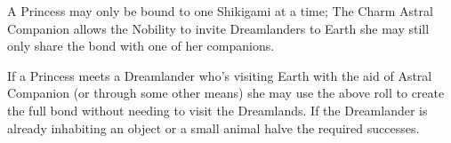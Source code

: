 A Princess may only be bound to one Shikigami at a time; The Charm Astral Companion allows the Nobility to invite Dreamlanders to Earth she may still only share the bond with one of her companions. 

If a Princess meets a Dreamlander who's visiting Earth with the aid of Astral Companion (or through some other means) she may use the above roll to create the full bond without needing to visit the Dreamlands. If the Dreamlander is already inhabiting an object or a small animal halve the required successes. 